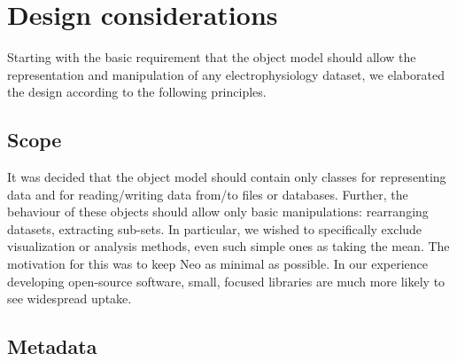\documentclass{frontiers}
\begin{document}
\section{Design considerations}


Starting with the basic requirement that the object model should allow the representation and manipulation of any electrophysiology dataset, we elaborated the design according to the following principles. 

\subsection{Scope}

It was decided that the object model should contain only classes for representing data and for reading/writing data from/to files or databases. Further, the behaviour of these objects should allow only basic manipulations: rearranging datasets, extracting sub-sets. In particular, we wished to specifically exclude visualization or analysis methods, even such simple ones as taking the mean. The motivation for this was to keep Neo as minimal as possible. In our experience developing open-source software, small, focused libraries are much more likely to see widespread uptake.

\subsection{Metadata}
\end{document}
